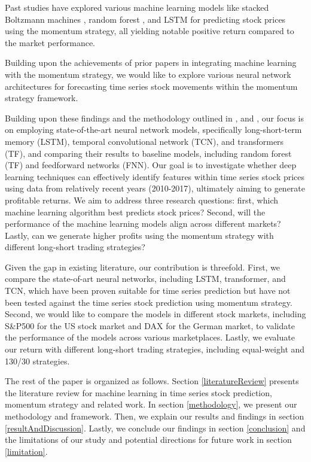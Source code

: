 \documentclass{article}
\begin{document}
Past studies have explored various machine learning models like stacked Boltzmann machines \citep{takeuchi2013applying}, random forest \citep{krauss2017deep, zhang2022statistical}, and LSTM \citep{fischer2018deep, fjellstrom2022long} for predicting stock prices using the momentum strategy, all yielding notable positive return compared to the market performance. 

Building upon the achievements of prior papers in integrating machine learning with the momentum strategy, we would like to explore various neural network architectures for forecasting time series stock movements within the momentum strategy framework.

Building upon these findings and the methodology outlined in \cite{krauss2017deep}, \cite{fischer2018deep} and \cite{takeuchi2013applying}, our focus is on employing state-of-the-art neural network models, specifically long-short-term memory (LSTM), temporal convolutional network (TCN), and transformers (TF), and comparing their results to baseline models, including random forest (TF) and feedforward networks (FNN). Our goal is to investigate whether deep learning techniques can effectively identify features within time series stock prices using data from relatively recent years (2010-2017), ultimately aiming to generate profitable returns. We aim to address three research questions: first, which machine learning algorithm best predicts stock prices? Second, will the performance of the machine learning models align across different markets? Lastly, can we generate higher profits using the momentum strategy with different long-short trading strategies?

Given the gap in existing literature, our contribution is threefold. First, we compare the state-of-art neural networks, including LSTM, transformer, and TCN, which have been proven suitable for time series prediction but have not been tested against the time series stock prediction using momentum strategy. Second, we would like to compare the models in different stock markets, including S\&P500 for the US stock market and DAX for the German market, to validate the performance of the models across various marketplaces. Lastly, we evaluate our return with different long-short trading strategies, including equal-weight and 130/30 strategies. 

The rest of the paper is organized as follows. Section \ref{literatureReview} presents the literature review for machine learning in time series stock prediction, momentum strategy and related work. In section \ref{methodology}, we present our methodology and framework. Then, we explain our results and findings in section \ref{resultAndDiscussion}. Lastly, we conclude our findings in section \ref{conclusion} and the limitations of our study and potential directions for future work in section \ref{limitation}. 
\end{document}
